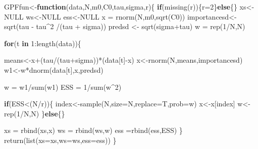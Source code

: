 \documentclass[
]{article}
\newenvironment{Shaded}{\begin{snugshade}}{\end{snugshade}}
\newcommand{\AttributeTok}[1]{\textcolor[rgb]{0.77,0.63,0.00}{#1}}
\newcommand{\ConstantTok}[1]{\textcolor[rgb]{0.00,0.00,0.00}{#1}}
\newcommand{\ControlFlowTok}[1]{\textcolor[rgb]{0.13,0.29,0.53}{\textbf{#1}}}
\newcommand{\DecValTok}[1]{\textcolor[rgb]{0.00,0.00,0.81}{#1}}
\newcommand{\FunctionTok}[1]{\textcolor[rgb]{0.00,0.00,0.00}{#1}}
\newcommand{\NormalTok}[1]{#1}
\newcommand{\OtherTok}[1]{\textcolor[rgb]{0.56,0.35,0.01}{#1}}
\newcommand{\SpecialCharTok}[1]{\textcolor[rgb]{0.00,0.00,0.00}{#1}}
\begin{document}
\begin{Shaded}
\begin{Highlighting}[]
\NormalTok{GPFfun}\OtherTok{\textless{}{-}}\ControlFlowTok{function}\NormalTok{(data,N,m0,C0,tau,sigma,r)\{}
  \ControlFlowTok{if}\NormalTok{(}\FunctionTok{missing}\NormalTok{(r))\{r}\OtherTok{=}\DecValTok{2}\NormalTok{\}}\ControlFlowTok{else}\NormalTok{\{\}}
\NormalTok{  xs}\OtherTok{\textless{}{-}}\ConstantTok{NULL}
\NormalTok{  ws}\OtherTok{\textless{}{-}}\ConstantTok{NULL}
\NormalTok{  ess}\OtherTok{\textless{}{-}}\ConstantTok{NULL}
\NormalTok{  x  }\OtherTok{=} \FunctionTok{rnorm}\NormalTok{(N,m0,}\FunctionTok{sqrt}\NormalTok{(C0))}
\NormalTok{  importancesd}\OtherTok{\textless{}{-}}\FunctionTok{sqrt}\NormalTok{(tau }\SpecialCharTok{{-}}\NormalTok{ tau}\SpecialCharTok{\^{}}\DecValTok{2} \SpecialCharTok{/}\NormalTok{(tau }\SpecialCharTok{+}\NormalTok{ sigma))}
\NormalTok{  predsd }\OtherTok{\textless{}{-}} \FunctionTok{sqrt}\NormalTok{(sigma}\SpecialCharTok{+}\NormalTok{tau)}
\NormalTok{  w  }\OtherTok{=} \FunctionTok{rep}\NormalTok{(}\DecValTok{1}\SpecialCharTok{/}\NormalTok{N,N)}
  
  \ControlFlowTok{for}\NormalTok{(t }\ControlFlowTok{in} \DecValTok{1}\SpecialCharTok{:}\FunctionTok{length}\NormalTok{(data))\{}
    
\NormalTok{    means}\OtherTok{\textless{}{-}}\NormalTok{x}\SpecialCharTok{+}\NormalTok{(tau}\SpecialCharTok{/}\NormalTok{(tau}\SpecialCharTok{+}\NormalTok{sigma))}\SpecialCharTok{*}\NormalTok{(data[t]}\SpecialCharTok{{-}}\NormalTok{x)}
\NormalTok{    x}\OtherTok{\textless{}{-}}\FunctionTok{rnorm}\NormalTok{(N,means,importancesd)}
\NormalTok{    w1}\OtherTok{\textless{}{-}}\NormalTok{w}\SpecialCharTok{*}\FunctionTok{dnorm}\NormalTok{(data[t],x,predsd)}
    
\NormalTok{    w }\OtherTok{=}\NormalTok{ w1}\SpecialCharTok{/}\FunctionTok{sum}\NormalTok{(w1)}
\NormalTok{    ESS  }\OtherTok{=} \DecValTok{1}\SpecialCharTok{/}\FunctionTok{sum}\NormalTok{(w}\SpecialCharTok{\^{}}\DecValTok{2}\NormalTok{)}
    
    \ControlFlowTok{if}\NormalTok{(ESS}\SpecialCharTok{\textless{}}\NormalTok{(N}\SpecialCharTok{/}\NormalTok{r))\{}
\NormalTok{      index}\OtherTok{\textless{}{-}}\FunctionTok{sample}\NormalTok{(N,}\AttributeTok{size=}\NormalTok{N,}\AttributeTok{replace=}\NormalTok{T,}\AttributeTok{prob=}\NormalTok{w)}
\NormalTok{      x}\OtherTok{\textless{}{-}}\NormalTok{x[index]}
\NormalTok{      w}\OtherTok{\textless{}{-}}\FunctionTok{rep}\NormalTok{(}\DecValTok{1}\SpecialCharTok{/}\NormalTok{N,N)}
\NormalTok{    \}}\ControlFlowTok{else}\NormalTok{\{\}}
    
\NormalTok{    xs }\OtherTok{=} \FunctionTok{rbind}\NormalTok{(xs,x)}
\NormalTok{    ws }\OtherTok{=} \FunctionTok{rbind}\NormalTok{(ws,w)}
\NormalTok{    ess }\OtherTok{=}\FunctionTok{rbind}\NormalTok{(ess,ESS)}
\NormalTok{  \}}
  \FunctionTok{return}\NormalTok{(}\FunctionTok{list}\NormalTok{(}\AttributeTok{xs=}\NormalTok{xs,}\AttributeTok{ws=}\NormalTok{ws,}\AttributeTok{ess=}\NormalTok{ess))}
\NormalTok{\}}
\end{Highlighting}
\end{Shaded}
\end{document}
